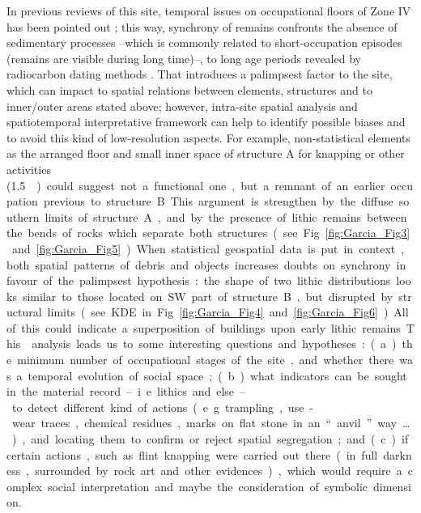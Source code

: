 In previous reviews of this site, temporal issues on occupational floors of Zone IV has been pointed out \parencite[see][]{Arias_2011}; this way, synchrony of remains confronts the absence of sedimentary processes –which is commonly related to short-occupation episodes (remains are visible during long time)–, to long age periods revealed by radiocarbon dating methods \parencite[35--39]{Arias_2011}. That introduces a palimpsest factor to the site, which can impact to spatial relations between elements, structures and to inner/outer areas stated above; however, intra-site spatial analysis and spatiotemporal interpretative framework can help to identify possible biases and to avoid this kind of low-resolution aspects. For example, non-statistical elements as the arranged floor and small inner space of structure A for knapping or other activities (\SI{1.5}{\metre\square}) could suggest not a functional one, but a remnant of an earlier occupation previous to structure B. This argument is strengthen by the diffuse southern limits of structure A, and by the presence of lithic remains between the bends of rocks which separate both structures (see Fig. \ref{fig:Garcia_Fig3} and \ref{fig:Garcia_Fig5}). When statistical geospatial data is put in context, both spatial patterns of debris and objects increases doubts on synchrony in favour of the palimpsest hypothesis: the shape of two lithic distributions looks similar to those located on SW part of structure B, but disrupted by structural limits (see KDE in Fig. \ref{fig:Garcia_Fig4} and \ref{fig:Garcia_Fig6}). All of this could indicate a superposition of buildings upon early lithic remains. 


This analysis leads us to some interesting questions and hypotheses: (a) the minimum number of occupational stages of the site, and whether there was a temporal evolution of social space; (b) what indicators can be sought in the material record –i.e. lithics and else– to detect different kind of actions (e.g. trampling, use-wear traces, chemical residues, marks on flat stone in an “anvil” way…), and locating them to confirm or reject spatial segregation; and (c) if certain actions, such as flint knapping were carried out there (in full darkness, surrounded by rock art and other evidences), which would require a complex social interpretation and maybe the consideration of symbolic dimension.

